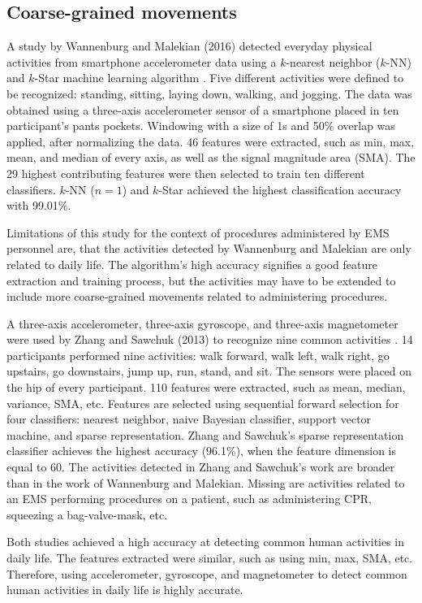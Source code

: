 \subsection{Coarse-grained movements}
A study by Wannenburg and Malekian (2016) detected everyday physical activities from smartphone accelerometer data using a $k$-nearest neighbor ($k$-NN) and $k$-Star machine learning algorithm \cite{Wannenburg2016}. Five different activities were defined to be recognized: standing, sitting, laying down, walking, and jogging. The data was obtained using a three-axis accelerometer sensor of a smartphone placed in ten participant's pants pockets. Windowing with a size of 1s and 50\% overlap was applied, after normalizing the data. 46 features were extracted, such as min, max, mean, and median of every axis, as well as the signal magnitude area (\gls{SMA}). The 29 highest contributing features were then selected to train ten different classifiers. $k$-NN ($n = 1$) and $k$-Star achieved the highest classification accuracy with 99.01\%.
\par Limitations of this study for the context of procedures administered by EMS personnel are, that the activities detected by Wannenburg and Malekian are only related to daily life. The algorithm's high accuracy signifies a good feature extraction and training process, but the activities may have to be extended to include more coarse-grained movements related to administering procedures.
\par A three-axis accelerometer, three-axis gyroscope, and three-axis magnetometer were used by Zhang and Sawchuk (2013) to recognize nine common activities \cite{Zhang2013}. 14 participants performed nine activities: walk forward, walk left, walk right, go upstairs, go downstairs, jump up, run, stand, and sit. The sensors were placed on the hip of every participant. 110 features were extracted, such as mean, median, variance, SMA, etc. Features are selected using sequential forward selection for four classifiers: nearest neighbor, naive Bayesian classifier, support vector machine, and sparse representation. Zhang and Sawchuk's sparse representation classifier achieves the highest accuracy (96.1\%), when the feature dimension is equal to 60. The activities detected in Zhang and Sawchuk's work are broader than in the work of Wannenburg and Malekian. Missing are activities related to an EMS performing procedures on a patient, such as administering CPR, squeezing a bag-valve-mask, etc.
\par Both studies achieved a high accuracy at detecting common human activities in daily life. The features extracted were similar, such as using min, max, SMA, etc. Therefore, using accelerometer, gyroscope, and magnetometer to detect common human activities in daily life is highly accurate.
